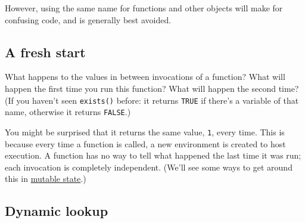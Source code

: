 \begin{Shaded}
\begin{Highlighting}[]
\StringTok{ }\StringTok{ }
\StringTok{ }
  \StringTok{ }
\NormalTok{\}}
\NormalTok{()}
\end{Highlighting}
\end{Shaded}

However, using the same name for functions and other objects will make
for confusing code, and is generally best avoided.

\subsection{A fresh start}\label{fresh-start}

What happens to the values in between invocations of a function? What
will happen the first time you run this function? What will happen the
second time? (If you haven't seen \texttt{exists()} before: it returns
\texttt{TRUE} if there's a variable of that name, otherwise it returns
\texttt{FALSE}.)

\begin{Shaded}
\begin{Highlighting}[]
\StringTok{ }
  \NormalTok{(}\NormalTok{)) \{}
    \StringTok{ }
    \StringTok{ }\StringTok{ }
  \NormalTok{\}}
\NormalTok{\}}
\NormalTok{()}
\end{Highlighting}
\end{Shaded}

You might be surprised that it returns the same value, \texttt{1}, every
time. This is because every time a function is called, a new environment
is created to host execution. A function has no way to tell what
happened the last time it was run; each invocation is completely
independent. (We'll see some ways to get around this in
\hyperref[mutable-state]{mutable state}.)

\subsection{Dynamic lookup}

